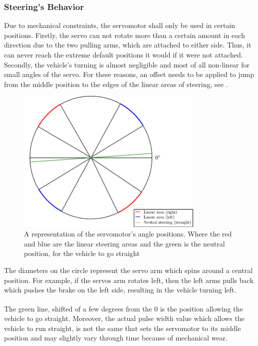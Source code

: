 \subsubsection{Steering's Behavior}\label{sec:SteeringBehavior}
Due to mechanical constraints, the servomotor shall only be used in certain positions. 
Firstly, the servo can not rotate more than a certain amount in each direction due to the two pulling arms, which are attached to either side. Thus, it can never reach the extreme default positions it would if it were not attached.
Secondly, the vehicle's turning is almost negligible and most of all non-linear for small angles of the servo. For these reasons, an offset needs to be applied to jump from the middle position to the edges of the linear areas of steering, see .

\begin{figure}[H]
  \centering  
  \includegraphics[width=0.8\textwidth]{figures/servoSteeringLinearArea.pdf}
  \caption{A representation of the servomotor's angle positions. Where the red and blue are the linear steering areas and the green is the neutral position, for the vehicle to go straight}
  \label{fig:servoSteeringLinearArea}
\end{figure}

The diameters on the circle represent the servo arm which spins around a central position. For example, if the servos arm rotates left, then the left arms pulls back which pushes the brake on the left side, resulting in the vehicle turning left.

The green line, shifted of a few degrees from the \si{0^{\circ}} is the position allowing the vehicle to go straight. Moreover, the actual pulse width value which allows the vehicle to run straight, is not the same that sets the servomotor to its middle position and may slightly vary through time because of mechanical wear.

